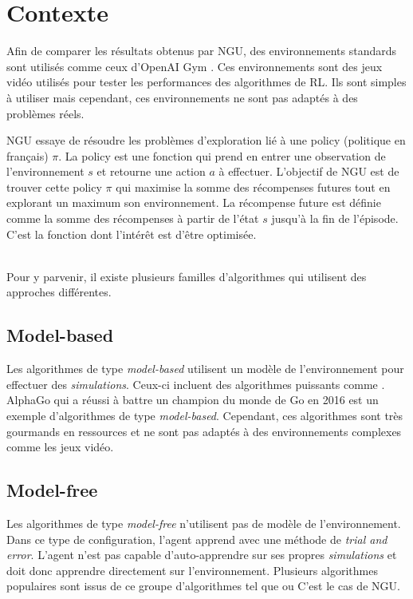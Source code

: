 \section{Contexte}






Afin de comparer les résultats obtenus par NGU, des environnements standards sont utilisés comme ceux d'OpenAI Gym \cite{OpenAI_Gym}. Ces environnements sont des jeux vidéo utilisés pour tester les performances des algorithmes de RL. Ils sont simples à utiliser mais cependant, ces environnements ne sont pas adaptés à des problèmes réels.

NGU essaye de résoudre les problèmes d'exploration lié à une policy (politique en français) $\pi$. La policy est une fonction qui prend en entrer une observation de l'environnement $s$ et retourne une action $a$ à effectuer. L'objectif de NGU est de trouver cette policy $\pi$ qui maximise la somme des récompenses futures tout en explorant un maximum son environnement. La récompense future est définie comme la somme des récompenses à partir de l'état $s$ jusqu'à la fin de l'épisode. C'est la fonction dont l'intérêt est d'être optimisée.

~\\
Pour y parvenir, il existe plusieurs familles d'algorithmes qui utilisent des approches différentes.

\subsection{Model-based}

Les algorithmes de type \textit{model-based} utilisent un modèle de l'environnement pour effectuer des \textit{simulations}. Ceux-ci incluent des algorithmes puissants comme . AlphaGo qui a réussi à battre un champion du monde de Go en 2016 est un exemple d'algorithmes de type \textit{model-based}. Cependant, ces algorithmes sont très gourmands en ressources et ne sont pas adaptés à des environnements complexes comme les jeux vidéo.

\subsection{Model-free}

Les algorithmes de type \textit{model-free} n'utilisent pas de modèle de l'environnement. Dans ce type de configuration, l'agent apprend avec une méthode de \textit{trial and error}. L'agent n'est pas capable d'auto-apprendre sur ses propres \textit{simulations} et doit donc apprendre directement sur l'environnement. Plusieurs algorithmes populaires sont issus de ce groupe d'algorithmes tel que  ou  C'est le cas de NGU.

